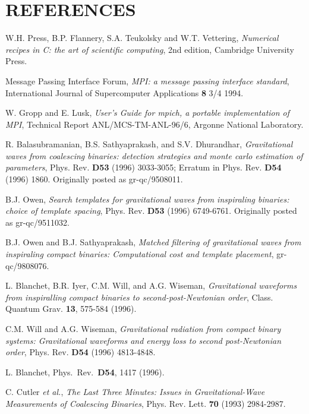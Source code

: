 \documentclass[11pt]{article}
\begin{document}
\section{REFERENCES}
\begin{thebibliography}{99}

W.H. Press, B.P. Flannery, S.A. Teukolsky and W.T. Vettering, {\it
Numerical recipes in C: the art of scientific computing}, 2nd edition,
Cambridge University Press.

Message Passing Interface Forum, {\it MPI: a message passing interface
standard}, International Journal of Supercomputer Applications {\bf 8} 3/4 1994.

W. Gropp and E. Lusk, {\it User's Guide for mpich, a portable implementation
of MPI}, Technical Report ANL/MCS-TM-ANL-96/6, Argonne National Laboratory.

R. Balasubramanian, B.S. Sathyaprakash, and S.V. Dhurandhar, {\it
Gravitational waves from coalescing binaries:  detection strategies and
monte carlo estimation of parameters}, Phys.  Rev.  {\bf D53} (1996)
3033-3055; Erratum in Phys. Rev. {\bf D54} (1996) 1860.  Originally
posted as gr-qc/9508011.

B.J. Owen, {\it Search templates for gravitational waves from
inspiraling binaries:  choice of template spacing}, Phys. Rev. {\bf
D53} (1996) 6749-6761.  Originally posted as gr-qc/9511032.

B.J. Owen and B.J. Sathyaprakash, {\it Matched filtering of gravitational
waves from inspiraling compact binaries: Computational cost and template
placement}, gr-qc/9808076.

L. Blanchet, B.R. Iyer, C.M. Will, and A.G. Wiseman,
{\it Gravitational waveforms from inspiralling compact binaries
to second-post-Newtonian order},
Class. Quantum Grav. {\bf 13}, 575-584 (1996).

C.M. Will and A.G. Wiseman, {\it Gravitational radiation from compact
binary systems: Gravitational waveforms and energy loss to second
post-Newtonian order}, Phys. Rev. {\bf D54} (1996) 4813-4848.

L. Blanchet, Phys.\ Rev.\  {\bf D54}, 1417 (1996).

C. Cutler {\it et al.}, {\it The Last Three Minutes: Issues in 
Gravitational-Wave Measurements of Coalescing Binaries},
Phys. Rev. Lett. {\bf 70} (1993) 2984-2987.


\end{thebibliography}
\end{document}
